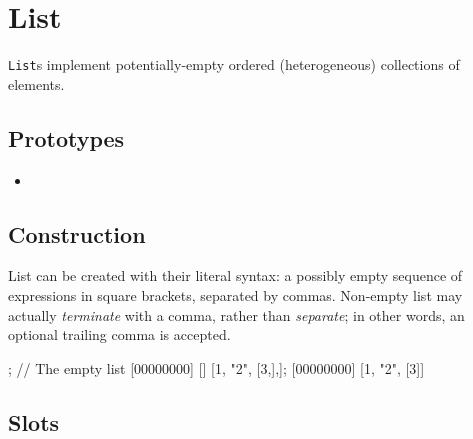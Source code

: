 \section{List}

\lstinline|List|s implement potentially-empty ordered (heterogeneous)
collections of elements.

\subsection{Prototypes}

\begin{itemize}
\item {}
\end{itemize}

\subsection{Construction}

List can be created with their literal syntax: a possibly empty
sequence of expressions in square brackets, separated by commas.
Non-empty list may actually \emph{terminate} with a comma, rather than
\emph{separate}; in other words, an optional trailing comma is accepted.

\begin{urbiscript}
[]; // The empty list
[00000000] []
[1, "2", [3,],];
[00000000] [1, "2", [3]]
\end{urbiscript}

\subsection{Slots}

